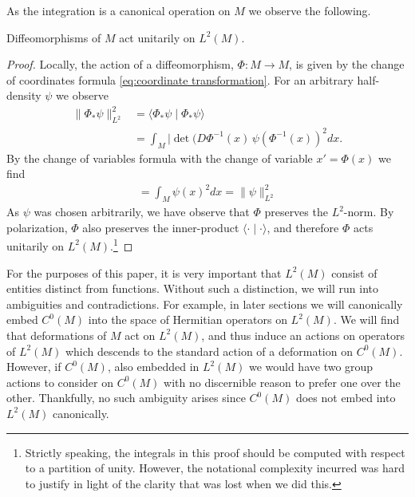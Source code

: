 \documentclass[final,leqno]{siamart}
\begin{document}
As the integration is a canonical operation on $M$ we observe the following.
\begin{proposition} \label{prop:unitary 1}
	Diffeomorphisms of $M$ act unitarily on $L^2(M)$.
\end{proposition}
\begin{proof}
	Locally, the action of a diffeomorphism, $\Phi: M \to M$, is given by the change of coordinates formula \eqref{eq:coordinate transformation}.
	For an arbitrary half-density $\psi$ we observe
	\begin{align*}
		\| \Phi_* \psi \|_{L^2}^2 &= \langle \Phi_* \psi \mid \Phi_* \psi \rangle \\
		&= \int_M | \det( D\Phi^{-1}(x) \, \psi( \Phi^{-1}(x) )^2 dx.
	\end{align*}
	By the change of variables formula with the change of variable $x' = \Phi(x)$ we find
	\begin{align*}
		= \int_M \psi(x )^2 dx = \| \psi \|_{L^2}^2
	\end{align*}
	As $\psi$ was chosen arbitrarily, we have observe that $\Phi$ preserves the $L^2$-norm.
	By polarization, $\Phi$ also preserves the inner-product $\langle \cdot \mid \cdot \rangle$,
	and therefore $\Phi$ acts unitarily on $L^2(M)$.\footnote{Strictly speaking, the integrals in this proof should be computed with respect to a partition of unity.  However, the notational complexity incurred was hard to justify in light of the clarity that was lost when we did this.}
\end{proof}

For the purposes of this paper, it is very important that $L^2(M)$ consist of entities distinct from functions.
Without such a distinction, we will run into ambiguities and contradictions.
For example, in later sections we will canonically embed $C^0(M)$ into the space of Hermitian operators on $L^2(M)$.
We will find that deformations of $M$ act on $L^2(M)$, and thus induce an actions on operators of $L^2(M)$ which descends to the standard action of a deformation on $C^0(M)$.
However, if $C^0(M)$, also embedded in $L^2(M)$ we would have two group actions to consider on $C^0(M)$ with no discernible reason to prefer one over the other.
Thankfully, no such ambiguity arises since $C^0(M)$ does not embed into $L^2(M)$ canonically.
\end{document}
